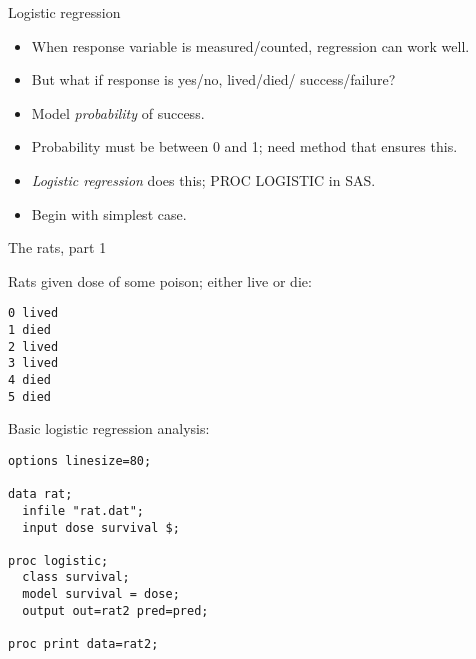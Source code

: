 \documentclass[pdf]{prosper}
\begin{document}
\begin{slide}{Logistic regression}

  \begin{itemize}
  \item When response variable is measured/counted, regression can work well.
  \item But what if response is yes/no, lived/died/ success/failure?
  \item Model {\em probability} of success.
  \item Probability must be between 0 and 1; need method that ensures this.
  \item {\em Logistic regression} does this; PROC LOGISTIC in SAS.
  \item Begin with simplest case.
  \end{itemize}
  
\end{slide}

\begin{slide}{The rats, part 1}

Rats given dose of some poison; either live or die:

\begin{verbatim}
0 lived
1 died
2 lived
3 lived
4 died
5 died
\end{verbatim}

Basic logistic regression analysis:

{\scriptsize
\begin{verbatim}
options linesize=80;

data rat;
  infile "rat.dat";
  input dose survival $;

proc logistic;
  class survival;
  model survival = dose;
  output out=rat2 pred=pred;

proc print data=rat2;
\end{verbatim}
}  

\end{slide}
\end{document}
